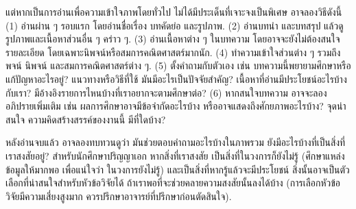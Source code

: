 \begin{Exercise}
แต่หากเป็นการอ่านเพื่อความเข้าใจภาพโดยทั่วไป ไม่ได้มีประเด็นที่เจาะจงเป็นพิเศษ
อาจลองวิธีดังนี้
(1) อ่านผ่าน ๆ รอบแรก โดยอ่านชื่อเรื่อง บทคัดย่อ และรูปภาพ.
(2) อ่านบทนำ และบทสรุป
แล้วดูรูปภาพและเนื้อหาส่วนอื่น ๆ คร่าว ๆ.
(3) อ่านเนื้อหาต่าง ๆ ในบทความ
โดยอาจจะยังไม่ต้องสนใจรายละเอียด โดยเฉพาะนิพจน์หรือสมการคณิตศาสตร์มากนัก.
(4) ทำความเข้าใจส่วนต่าง ๆ รวมถึงพจน์ นิพจน์ และสมการคณิตศาสตร์ต่าง ๆ.
(5) ตั้งคำถามกับตัวเอง เช่น
บทความนี้พยายามศึกษาหรือแก้ปัญหาอะไรอยู่?
แนวทางหรือวิธีที่ใช้ มันมีอะไรเป็นปัจจัยสำคัญ?
เนื้อหาที่อ่านมีประโยชน์อะไรบ้างกับเรา?
มีอ้างอิงรายการไหนบ้างที่เราอยากจะตามศึกษาต่อ?
(6) หากสนใจบทความ
อาจจะลองอภิปรายเพิ่มเติม เช่น
ผลการศึกษาอาจมีข้อจำกัดอะไรบ้าง หรืออาจแสดงถึงศักยภาพอะไรบ้าง?
จุดน่าสนใจ ความคิดสร้างสรรค์ของงานนี้
มีที่ใดบ้าง?

หลังอ่านจบแล้ว อาจลองทบทวนดูว่า
มันช่วยตอบคำถามอะไรบ้างในภาพรวม
ยังมีอะไรบ้างที่เป็นสิ่งที่เราสงสัยอยู่?
สำหรับนักศึกษาปริญญาเอก
หากสิ่งที่เราสงสัย
เป็นสิ่งที่ในวงการก็ยังไม่รู้ (ศึกษาแหล่งข้อมูลให้มากพอ เพื่อแน่ใจว่า ในวงการยังไม่รู้)
และเป็นสิ่งที่หากรู้แล้วจะมีประโยชน์ 
สิ่งนั้นอาจเป็นตัวเลือกที่น่าสนใจสำหรับหัวข้อวิจัยได้ ถ้าเราพอที่จะช่วยคลายความสงสัยนั้นลงได้บ้าง (การเลือกหัวข้อวิจัยมีความเสี่ยงสูงมาก ควรปรึกษาอาจารย์ที่ปรึกษาก่อนตัดสินใจ).


\end{Exercise}

